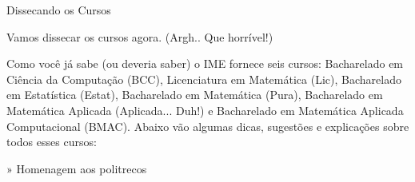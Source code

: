 \begin{secao}{Dissecando os Cursos}

Vamos dissecar os cursos agora. (Argh.. Que horrível!)

Como você já sabe (ou deveria saber) o IME fornece seis cursos: Bacharelado em
Ciência da Computação (BCC), Licenciatura em Matemática (Lic), Bacharelado em
Estatística (Estat), Bacharelado em Matemática (Pura), Bacharelado em
Matemática Aplicada (Aplicada... Duh!)  e Bacharelado em Matemática Aplicada
Computacional (BMAC). Abaixo vão algumas dicas, sugestões e explicações sobre
todos esses cursos:










» Homenagem aos politrecos


\clearpage



\end{secao}
